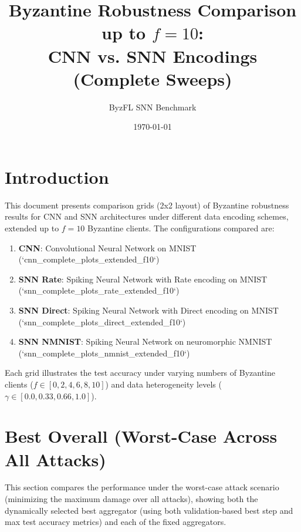 \documentclass{article}
\title{Byzantine Robustness Comparison up to $f=10$:\\CNN vs. SNN Encodings (Complete Sweeps)}
\author{ByzFL SNN Benchmark}
\date{\today}
\begin{document}
\maketitle

\tableofcontents
\newpage

\section{Introduction}
This document presents comparison grids (2x2 layout) of Byzantine robustness results for CNN and SNN architectures under different data encoding schemes, extended up to $f=10$ Byzantine clients. The configurations compared are:
\begin{enumerate}
    \item \textbf{CNN}: Convolutional Neural Network on MNIST (`cnn\_complete\_plots\_extended\_f10`)
    \item \textbf{SNN Rate}: Spiking Neural Network with Rate encoding on MNIST (`snn\_complete\_plots\_rate\_extended\_f10`)
    \item \textbf{SNN Direct}: Spiking Neural Network with Direct encoding on MNIST (`snn\_complete\_plots\_direct\_extended\_f10`)
    \item \textbf{SNN NMNIST}: Spiking Neural Network on neuromorphic NMNIST (`snn\_complete\_plots\_nmnist\_extended\_f10`)
\end{enumerate}

Each grid illustrates the test accuracy under varying numbers of Byzantine clients ($f \in [0, 2, 4, 6, 8, 10]$) and data heterogeneity levels ($\gamma \in [0.0, 0.33, 0.66, 1.0]$).

\newpage

\section{Best Overall (Worst-Case Across All Attacks)}
\label{sec:best_overall}
This section compares the performance under the worst-case attack scenario (minimizing the maximum damage over all attacks), showing both the dynamically selected best aggregator (using both validation-based best step and max test accuracy metrics) and each of the fixed aggregators.
\end{document}
